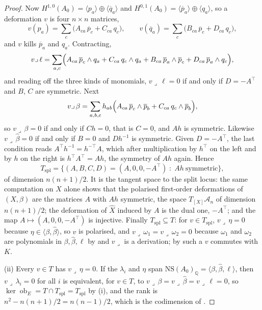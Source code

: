 \documentclass[11pt,reqno]{amsart}
\theoremstyle{plain}
\theoremstyle{definition}
\theoremstyle{remark}
\newcommand{\QQ}{\mathbb{Q}}
\newcommand{\cA}{\mathcal{A}}
\newcommand{\NS}{\mathrm{NS}}
\DeclareMathOperator{\ob}{ob}
\newcommand{\bbar}[1]{\overline{#1}}
\begin{document}
\begin{proof}
Now $H^{1,0}(A_{0})=\langle p_{a}\rangle\oplus\langle\bbar q_{a}\rangle$ and
$H^{0,1}(A_{0})=\langle\bbar p_{a}\rangle\oplus\langle q_{a}\rangle$, so a
deformation $v$ is four $n\times n$ matrices,
\[
  v(p_{a})=\sum_{c}\bigl(A_{ca}\,\bbar p_{c}+C_{ca}\,q_{c}\bigr),
  \qquad
  v(\bbar q_{a})=\sum_{c}\bigl(B_{ca}\,\bbar p_{c}+D_{ca}\,q_{c}\bigr),
\]
and $v$ kills $\bbar p_{a}$ and $q_{a}$. Contracting,
\[
  v\lrcorner\,\ell
  =\sum_{a,c}\Bigl(A_{ca}\,\bbar p_{c}\wedge q_{a}+C_{ca}\,q_{c}\wedge q_{a}
   +B_{ca}\,\bbar p_{a}\wedge\bbar p_{c}+D_{ca}\,\bbar p_{a}\wedge q_{c}\Bigr),
\]
and reading off the three kinds of monomials, $v\lrcorner\,\ell=0$ if and only
if $D=-A^{\top}$ and $B$, $C$ are symmetric. Next
\[
  v\lrcorner\,\beta
  =\sum_{a,b,c}h_{ab}\Bigl(A_{ca}\,\bbar p_{c}\wedge\bbar p_{b}
   +C_{ca}\,q_{c}\wedge\bbar p_{b}\Bigr),
\]
so $v\lrcorner\,\beta=0$ if and only if $Ch=0$, that is $C=0$, and $Ah$ is
symmetric. Likewise $v\lrcorner\,\widehat\beta=0$ if and only if $B=0$ and
$Dh^{-1}$ is symmetric. Given $D=-A^{\top}$, the last condition reads
$A^{\top}h^{-1}=h^{-\top}A$, which after multiplication by $h^{\top}$ on the
left and by $h$ on the right is $h^{\top}A^{\top}=Ah$, the symmetry of $Ah$
again. Hence
\[
  T_{\mathrm{spl}}=\bigl\{(A,B,C,D)=(A,0,0,-A^{\top})\;:\;Ah\ \text{symmetric}\bigr\},
\]
of dimension $n(n+1)/2$. It is the tangent space to the split locus: the
same computation on $X$ alone shows that the polarised first-order
deformations of $(X,\beta)$ are the matrices $A$ with $Ah$ symmetric, the
space $T_{[X]}\cA_{n}$ of dimension $n(n+1)/2$; the deformation of
$\widehat X$ induced by $A$ is the dual one, $-A^{\top}$; and the map
$A\mapsto(A,0,0,-A^{\top})$ is injective. Finally $T_{\mathrm{spl}}\subseteq
T$: for $v\in T_{\mathrm{spl}}$, $v\lrcorner\,\eta=0$ because
$\eta\in\langle\beta,\widehat\beta\rangle$, so $v$ is polarised, and
$v\lrcorner\,\omega_{1}=v\lrcorner\,\omega_{2}=0$ because $\omega_{1}$ and
$\omega_{2}$ are polynomials in $\beta,\widehat\beta,\ell$ by
\cite[Theorem~15.2]{paperI} and $v\lrcorner$ is a derivation; by
\cite[Proposition~9.14]{paperI} such a $v$ commutes with $K$.

(ii) Every $v\in T$ has $v\lrcorner\,\eta=0$. If the $\lambda_{i}$ and
$\eta$ span $\NS(A_{0})_{\QQ}=\langle\beta,\widehat\beta,\ell\rangle$, then
$v\lrcorner\,\lambda_{i}=0$ for all $i$ is equivalent, for $v\in T$, to
$v\lrcorner\,\beta=v\lrcorner\,\widehat\beta=v\lrcorner\,\ell=0$, so
$\ker\ob_{E}=T\cap T_{\mathrm{spl}}=T_{\mathrm{spl}}$ by (i), and the rank
is $n^{2}-n(n+1)/2=n(n-1)/2$, which is the codimension of
\cite[Proposition~15.19(iii)]{paperI}.


\end{proof}
\end{document}
